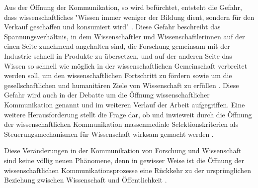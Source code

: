 Aus der Öffnung der Kommunikation, so wird befürchtet, entsteht die Gefahr, dass wissenschaftliches "Wissen immer weniger der Bildung dient, sondern für den Verkauf geschaffen und konsumiert wird" \cite{Hagner_2015}. Diese Gefahr beschreibt das Spannungsverhältnis, in dem Wissenschaftler und Wissenschaftlerinnen auf der einen Seite zunehmend angehalten sind, die Forschung gemeinsam mit der Industrie schnell in Produkte zu übersetzen, und auf der anderen Seite das Wissen so schnell wie möglich in der wissenschaftlichen Gemeinschaft verbreitet werden soll, um den wissenschaftlichen Fortschritt zu fördern sowie um die gesellschaftlichen und humanitären Ziele von Wissenschaft zu erfüllen \cite{Harmon_2012} \cite{Woelfle_2011}. Diese Gefahr wird auch in der Debatte um die Öffnung wissenschaftlicher Kommunikation genannt \cite{Kansa_2014} \cite{Bunz_2013} \cite{Tkacz_2012} \cite{Mirowski_2005} und im weiteren Verlauf der Arbeit aufgegriffen. Eine weitere Herausforderung stellt die Frage dar, ob und inwieweit durch die Öffnung der wissenschaftlichen Kommunikation massenmediale Selektionskriterien als Steuerungsmechanismen für Wissenschaft wirksam gemacht werden \cite[:20]{BBAW_2015}.

Diese Veränderungen in der Kommunikation von Forschung und Wissenschaft sind keine völlig neuen Phänomene, denn in gewisser Weise ist die Öffnung der wissenschaftlichen Kommunikationsprozesse eine Rückkehr zu der ursprünglichen Beziehung zwischen Wissenschaft und Öffentlichkeit \cite{Konneker_2013} \cite{Weingart_2005}.

